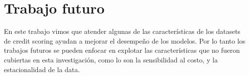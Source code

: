 
\section{Trabajo futuro}

En este trabajo vimos que atender algunas de las características de los datasets de credit scoring ayudan a mejorar el desempeño de los modelos. Por lo tanto los trabajos futuros se pueden enfocar en explotar las características que no fueron cubiertas en esta investigación, como lo son la sensibilidad al costo, y la estacionalidad de la data.


